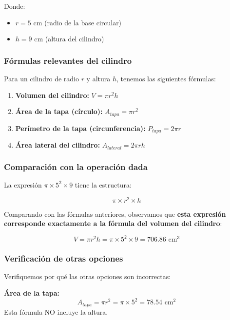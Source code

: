 \documentclass[
]{article}
\providecommand{\tightlist}{%
  \setlength{\itemsep}{0pt}\setlength{\parskip}{0pt}}
\begin{document}
Donde:

\begin{itemize}
\tightlist
\item
  \(r = 5\) cm (radio de la base circular)
\item
  \(h = 9\) cm (altura del cilindro)
\end{itemize}

\subsubsection{Fórmulas relevantes del
cilindro}\label{fuxf3rmulas-relevantes-del-cilindro}

Para un cilindro de radio \(r\) y altura \(h\), tenemos las siguientes
fórmulas:

\begin{enumerate}
\def\labelenumi{\arabic{enumi}.}
\tightlist
\item
  \textbf{Volumen del cilindro:} \(V = \pi r^2 h\)
\item
  \textbf{Área de la tapa (círculo):} \(A_{tapa} = \pi r^2\)
\item
  \textbf{Perímetro de la tapa (circunferencia):} \(P_{tapa} = 2\pi r\)
\item
  \textbf{Área lateral del cilindro:} \(A_{lateral} = 2\pi r h\)
\end{enumerate}

\subsubsection{Comparación con la operación
dada}\label{comparaciuxf3n-con-la-operaciuxf3n-dada}

La expresión \(\pi \times 5^2 \times 9\) tiene la estructura:

\[\pi \times r^2 \times h\]

Comparando con las fórmulas anteriores, observamos que \textbf{esta
expresión corresponde exactamente a la fórmula del volumen del
cilindro}:

\[V = \pi r^2 h = \pi \times 5^2 \times 9 = 706.86 \text{ cm}^3\]

\subsubsection{Verificación de otras
opciones}\label{verificaciuxf3n-de-otras-opciones}

Verifiquemos por qué las otras opciones son incorrectas:

\textbf{Área de la tapa:}
\[A_{tapa} = \pi r^2 = \pi \times  5 ^2 =  78.54  \text{ cm}^2\] Esta
fórmula NO incluye la altura.
\end{document}
